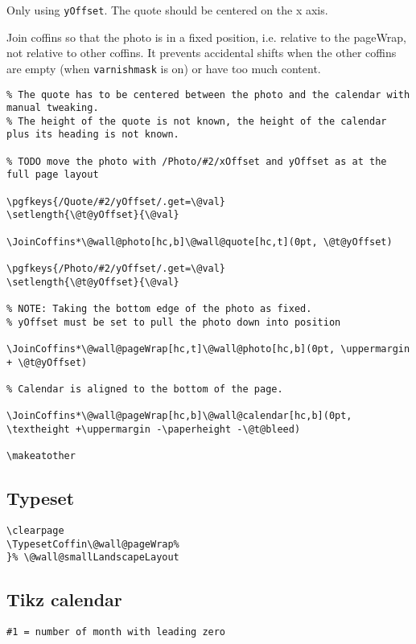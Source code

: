 \documentclass[11pt,oneside]{memoir-article}
\begin{document}
Only using \texttt{yOffset}. The quote should be centered on the x axis.

Join coffins so that the photo is in a fixed position, i.e. relative to the
pageWrap, not relative to other coffins. It prevents accidental shifts when the
other coffins are empty (when \texttt{varnishmask} is on) or have too much content.

\begin{verbatim}
% The quote has to be centered between the photo and the calendar with manual tweaking.
% The height of the quote is not known, the height of the calendar plus its heading is not known.

% TODO move the photo with /Photo/#2/xOffset and yOffset as at the full page layout

\pgfkeys{/Quote/#2/yOffset/.get=\@val}
\setlength{\@t@yOffset}{\@val}

\JoinCoffins*\@wall@photo[hc,b]\@wall@quote[hc,t](0pt, \@t@yOffset)

\pgfkeys{/Photo/#2/yOffset/.get=\@val}
\setlength{\@t@yOffset}{\@val}

% NOTE: Taking the bottom edge of the photo as fixed.
% yOffset must be set to pull the photo down into position

\JoinCoffins*\@wall@pageWrap[hc,t]\@wall@photo[hc,b](0pt, \uppermargin + \@t@yOffset)

% Calendar is aligned to the bottom of the page.

\JoinCoffins*\@wall@pageWrap[hc,b]\@wall@calendar[hc,b](0pt, \textheight +\uppermargin -\paperheight -\@t@bleed)

\makeatother
\end{verbatim}

\subsection{Typeset}
\label{sec:org98357bb}

\begin{verbatim}
\clearpage
\TypesetCoffin\@wall@pageWrap%
}% \@wall@smallLandscapeLayout
\end{verbatim}

\subsection{Tikz calendar}
\label{sec:orga334fd7}

\begin{verbatim}
#1 = number of month with leading zero
\end{verbatim}
\end{document}
